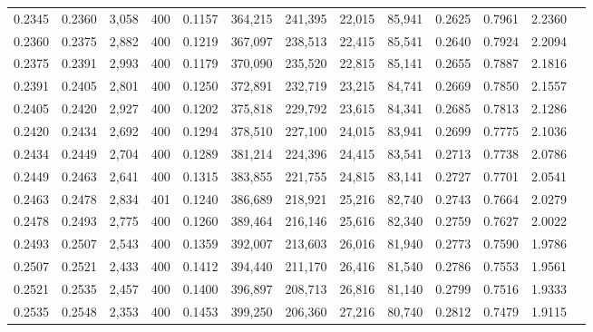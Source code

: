 \begin{tabular}{rrrrrrrrrrrrr}
0.2345 & 0.2360 &  3,058 &   400 &                                     0.1157 & 364,215 & 241,395 &  22,015 &  85,941 & 0.2625 & 0.7961 & 2.2360 \\
0.2360 & 0.2375 &  2,882 &   400 &                                     0.1219 & 367,097 & 238,513 &  22,415 &  85,541 & 0.2640 & 0.7924 & 2.2094 \\
0.2375 & 0.2391 &  2,993 &   400 &                                     0.1179 & 370,090 & 235,520 &  22,815 &  85,141 & 0.2655 & 0.7887 & 2.1816 \\
0.2391 & 0.2405 &  2,801 &   400 &                                     0.1250 & 372,891 & 232,719 &  23,215 &  84,741 & 0.2669 & 0.7850 & 2.1557 \\
0.2405 & 0.2420 &  2,927 &   400 &                                     0.1202 & 375,818 & 229,792 &  23,615 &  84,341 & 0.2685 & 0.7813 & 2.1286 \\
0.2420 & 0.2434 &  2,692 &   400 &                                     0.1294 & 378,510 & 227,100 &  24,015 &  83,941 & 0.2699 & 0.7775 & 2.1036 \\
0.2434 & 0.2449 &  2,704 &   400 &                                     0.1289 & 381,214 & 224,396 &  24,415 &  83,541 & 0.2713 & 0.7738 & 2.0786 \\
0.2449 & 0.2463 &  2,641 &   400 &                                     0.1315 & 383,855 & 221,755 &  24,815 &  83,141 & 0.2727 & 0.7701 & 2.0541 \\
0.2463 & 0.2478 &  2,834 &   401 &                                     0.1240 & 386,689 & 218,921 &  25,216 &  82,740 & 0.2743 & 0.7664 & 2.0279 \\
0.2478 & 0.2493 &  2,775 &   400 &                                     0.1260 & 389,464 & 216,146 &  25,616 &  82,340 & 0.2759 & 0.7627 & 2.0022 \\
0.2493 & 0.2507 &  2,543 &   400 &                                     0.1359 & 392,007 & 213,603 &  26,016 &  81,940 & 0.2773 & 0.7590 & 1.9786 \\
0.2507 & 0.2521 &  2,433 &   400 &                                     0.1412 & 394,440 & 211,170 &  26,416 &  81,540 & 0.2786 & 0.7553 & 1.9561 \\
0.2521 & 0.2535 &  2,457 &   400 &                                     0.1400 & 396,897 & 208,713 &  26,816 &  81,140 & 0.2799 & 0.7516 & 1.9333 \\
0.2535 & 0.2548 &  2,353 &   400 &                                     0.1453 & 399,250 & 206,360 &  27,216 &  80,740 & 0.2812 & 0.7479 & 1.9115 \\

\end{tabular}
